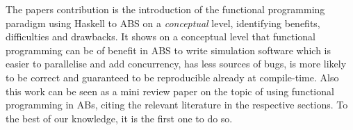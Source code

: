 The papers contribution is the introduction of the functional programming paradigm using Haskell to ABS on a \textit{conceptual} level, identifying benefits, difficulties and drawbacks. It shows on a conceptual level that functional programming can be of benefit in ABS to write simulation software which is easier to parallelise and add concurrency, has less sources of bugs, is more likely to be correct and guaranteed to be reproducible already at compile-time. Also this work can be seen as a mini review paper on the topic of using functional programming in ABs, citing the relevant literature in the respective sections. To the best of our knowledge, it is the first one to do so.